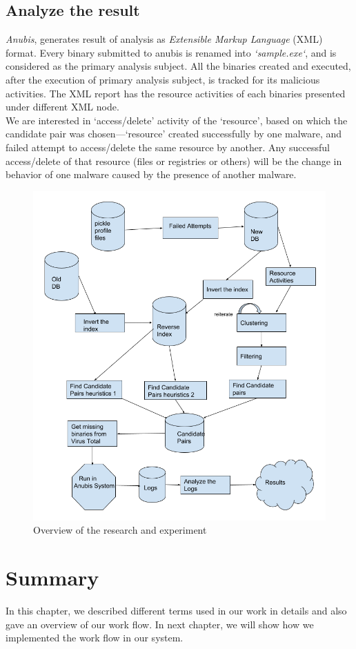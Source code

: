 \subsection{Analyze the result}
\label{sub:Analyze the result}
\emph{Anubis}, generates result of analysis as \emph{Extensible Markup Language} (XML) format.
Every binary submitted to anubis is renamed into \emph{`sample.exe`}, and is considered as the primary analysis subject.
All the binaries created and executed, after the execution of primary analysis subject, is tracked for its malicious activities.
The XML report has the resource activities of each binaries presented under different XML node.\\
We are interested in `access/delete' activity of the `resource', based on which the candidate pair was chosen---`resource' created successfully by one malware, and failed attempt to access/delete the same resource by another.
Any successful access/delete of that resource (files or registries or others) will be the change in behavior of one malware caused by the presence of another malware.
\begin{figure}[htbp]
  \centering
  \includegraphics[scale=0.5]{figures/bigpicture.png}
  \caption[Big Picture]{Overview of the research and experiment}\label{fig:bigpicture}
\end{figure}
\section{Summary}
\label{sec:Summary}
In this chapter, we described different terms used in our work in details and also gave an overview of our work flow.
In next chapter, we will show how we implemented the work flow in our system.

